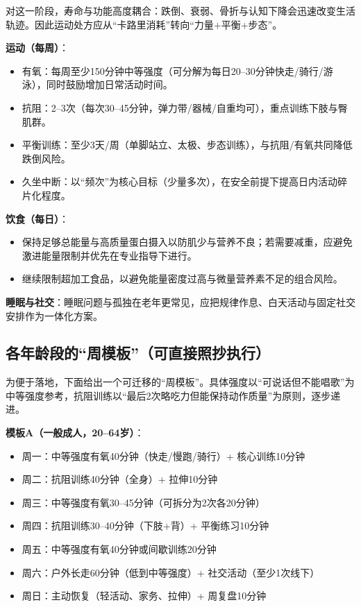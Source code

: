 \documentclass[11pt,a4paper]{article}
\begin{document}
对这一阶段，寿命与功能高度耦合：跌倒、衰弱、骨折与认知下降会迅速改变生活轨迹。因此运动处方应从“卡路里消耗”转向“力量+平衡+步态”。\cite{internationalexerciserecommendations2021}

\textbf{运动（每周）}：
\begin{itemize}
  \item 有氧：每周至少150分钟中等强度（可分解为每日20--30分钟快走/骑行/游泳），同时鼓励增加日常活动时间\cite{who2020physicalactivity}。
  \item 抗阻：2--3次（每次30--45分钟，弹力带/器械/自重均可），重点训练下肢与臀肌群。
  \item 平衡训练：至少3天/周（单脚站立、太极、步态训练），与抗阻/有氧共同降低跌倒风险\cite{internationalexerciserecommendations2021}。
  \item 久坐中断：以“频次”为核心目标（少量多次），在安全前提下提高日内活动碎片化程度\cite{sedentarytimeand2022}。
\end{itemize}

\textbf{饮食（每日）}：
\begin{itemize}
  \item 保持足够总能量与高质量蛋白摄入以防肌少与营养不良；若需要减重，应避免激进能量限制并优先在专业指导下进行\cite{anincreasedneed2015}。
  \item 继续限制超加工食品，以避免能量密度过高与微量营养素不足的组合风险\cite{ultraprocessedfood2022}。
\end{itemize}

\textbf{睡眠与社交}：睡眠问题与孤独在老年更常见，应把规律作息、白天活动与固定社交安排作为一体化方案\cite{aasm2015sleep,associationofloneliness2018}。

\subsection{各年龄段的“周模板”（可直接照抄执行）}

为便于落地，下面给出一个可迁移的“周模板”。具体强度以“可说话但不能唱歌”为中等强度参考，抗阻训练以“最后2次略吃力但能保持动作质量”为原则，逐步递进。

\textbf{模板A（一般成人，20--64岁）}：
\begin{itemize}
  \item 周一：中等强度有氧40分钟（快走/慢跑/骑行）+ 核心训练10分钟
  \item 周二：抗阻训练40分钟（全身）+ 拉伸10分钟
  \item 周三：中等强度有氧30--45分钟（可拆分为2次各20分钟）
  \item 周四：抗阻训练30--40分钟（下肢+背）+ 平衡练习10分钟
  \item 周五：中等强度有氧40分钟或间歇训练20分钟
  \item 周六：户外长走60分钟（低到中等强度）+ 社交活动（至少1次线下）
  \item 周日：主动恢复（轻活动、家务、拉伸）+ 周复盘10分钟
\end{itemize}
\end{document}
